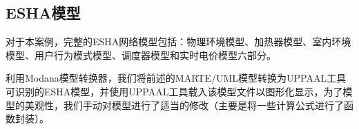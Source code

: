 

\subsection{ESHA模型}
	对于本案例，完整的ESHA网络模型包括：物理环境模型、加热器模型、室内环境模型、用户行为模式模型、调度器模型和实时电价模型六部分。

	利用Modana模型转换器，我们将前述的MARTE/UML模型转换为UPPAAL工具可识别的ESHA模型，并使用UPPAAL工具载入该模型文件以图形化显示，为了模型的美观性，我们手动对模型进行了适当的修改（主要是将一些计算公式进行了函数封装）。
	
